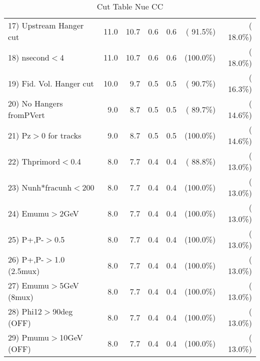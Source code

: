\begin{table}[h!]
\begin{tabular}{||l||r|r|r|r|r|r||}
 17) Upstream Hanger cut  &         11.0 &         10.7 &          0.6 &          0.6 & ( 91.5\%) & ( 18.0\%) \\
 18) nsecond$<$4          &         11.0 &         10.7 &          0.6 &          0.6 & (100.0\%) & ( 18.0\%) \\
 19) Fid. Vol. Hanger cut &         10.0 &          9.7 &          0.5 &          0.5 & ( 90.7\%) & ( 16.3\%) \\
 20) No Hangers fromPVert &          9.0 &          8.7 &          0.5 &          0.5 & ( 89.7\%) & ( 14.6\%) \\
 21) Pz$>$0 for tracks    &          9.0 &          8.7 &          0.5 &          0.5 & (100.0\%) & ( 14.6\%) \\
 22) Thprimord$<$0.4      &          8.0 &          7.7 &          0.4 &          0.4 & ( 88.8\%) & ( 13.0\%) \\
 23) Nunh*fracunh$<$200   &          8.0 &          7.7 &          0.4 &          0.4 & (100.0\%) & ( 13.0\%) \\
 24) Emumu$>$2GeV         &          8.0 &          7.7 &          0.4 &          0.4 & (100.0\%) & ( 13.0\%) \\
 25) P+,P-$>$0.5          &          8.0 &          7.7 &          0.4 &          0.4 & (100.0\%) & ( 13.0\%) \\
 26) P+,P-$>$1.0 (2.5mux) &          8.0 &          7.7 &          0.4 &          0.4 & (100.0\%) & ( 13.0\%) \\
 27) Emumu$>$5GeV  (8mux) &          8.0 &          7.7 &          0.4 &          0.4 & (100.0\%) & ( 13.0\%) \\
 28) Phi12$>$90deg  (OFF) &          8.0 &          7.7 &          0.4 &          0.4 & (100.0\%) & ( 13.0\%) \\
 29) Pmumu$>$10GeV  (OFF) &          8.0 &          7.7 &          0.4 &          0.4 & (100.0\%) & ( 13.0\%) \\
 \hline
 \hline
 \end{tabular}
 \caption{Cut Table   Nue CC  }
 \label{tab-cutcohjpsi-mumu_nuecc}
 \end{table}
